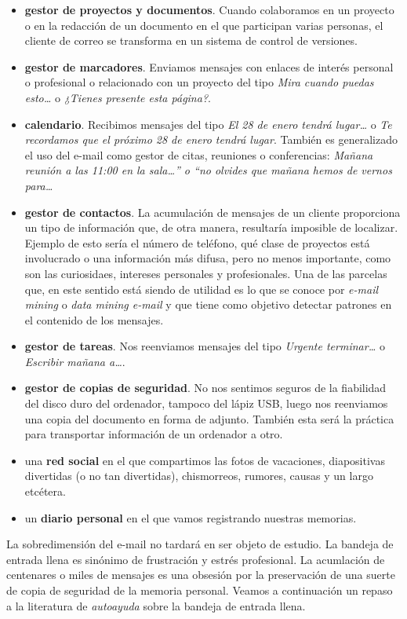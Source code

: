 \documentclass[12pt, a4paper,twoside]{book}
\begin{document}
\begin{itemize}
\item
  \textbf{gestor de proyectos y documentos}. Cuando colaboramos en un
  proyecto o en la redacción de un documento en el que participan
  varias personas, el cliente de correo se transforma en un sistema
  de control de versiones.
\item
  \textbf{gestor de marcadores}. Enviamos mensajes con enlaces de
  interés personal o profesional o relacionado con un proyecto del
  tipo \emph{Mira cuando puedas esto\ldots{}} o
  \emph{¿Tienes presente esta página?}.
\item
  \textbf{calendario}. Recibimos mensajes del tipo
  \emph{El 28 de enero tendrá lugar\ldots{}} o
  \emph{Te recordamos que el próximo 28 de enero tendrá lugar}.
  También es generalizado el uso del e-mail como gestor de citas,
  reuniones o conferencias:
  \emph{Mañana reunión a las 11:00 en la sala\ldots{}” o “no olvides que mañana hemos de vernos para\ldots{}}
\item
  \textbf{gestor de contactos}. La acumulación de mensajes de un
  cliente proporciona un tipo de información que, de otra manera,
  resultaría imposible de localizar. Ejemplo de esto sería el número
  de teléfono, qué clase de proyectos está involucrado o una
  información más difusa, pero no menos importante, como son las
  curiosidaes, intereses personales y profesionales. Una de las
  parcelas que, en este sentido está siendo de utilidad es lo que se
  conoce por \emph{e-mail mining} o \emph{data mining e-mail} y que
  tiene como objetivo detectar patrones en el contenido de los
  mensajes.
\item
  \textbf{gestor de tareas}. Nos reenviamos mensajes del tipo
  \emph{Urgente terminar\ldots{}} o \emph{Escribir mañana a\ldots{}}.
\item
  \textbf{gestor de copias de seguridad}. No nos sentimos seguros de
  la fiabilidad del disco duro del ordenador, tampoco del lápiz USB,
  luego nos reenviamos una copia del documento en forma de adjunto.
  También esta será la práctica para transportar información de un
  ordenador a otro.
\item
  una \textbf{red social} en el que compartimos las fotos de
  vacaciones, diapositivas divertidas (o no tan divertidas),
  chismorreos, rumores, causas y un largo etcétera.
\item
  un \textbf{diario personal} en el que vamos registrando nuestras
  memorias.
\end{itemize}
La sobredimensión del e-mail no tardará en ser objeto de estudio.
La bandeja de entrada llena es sinónimo de frustración y estrés
profesional. La acumlación de centenares o miles de mensajes es una
obsesión por la preservación de una suerte de copia de seguridad de
la memoria personal. Veamos a continuación un repaso a la
literatura de \emph{autoayuda} sobre la bandeja de entrada llena.
\end{document}
